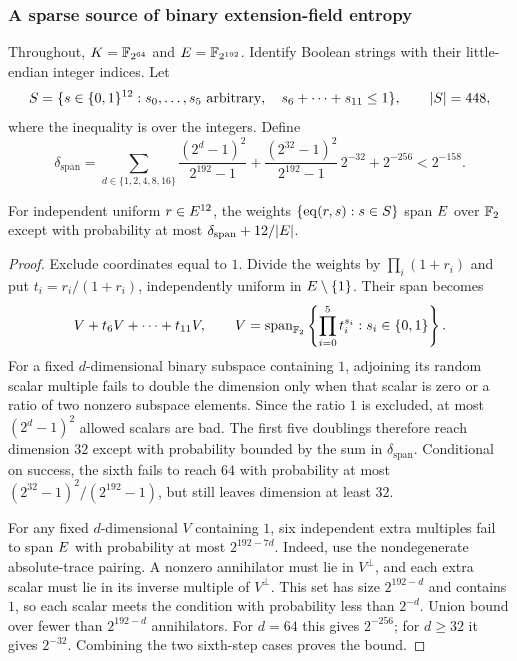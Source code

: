 \subsubsection{A sparse source of binary extension-field entropy}

Throughout, $K=\mathbb{F}_{2^{64}}$ and $E=\mathbb{F}_{2^{192}}$. Identify Boolean strings with their little-endian integer indices. Let
\[
 S=\{s\in\{0,1\}^{12}:s_0,\ldots,s_5\text{ arbitrary},\quad
                     s_6+\cdots+s_{11}\le1\},\qquad |S|=448,
\]
where the inequality is over the integers. Define
\[
 \delta_{\mathrm{span}}=
 \sum_{d\in\{1,2,4,8,16\}}\frac{(2^d-1)^2}{2^{192}-1}
 +\frac{(2^{32}-1)^2}{2^{192}-1}\,2^{-32}+2^{-256}
 <2^{-158}.
\]

\begin{lemma}\label{lem:binary-span}
For independent uniform $r\in E^{12}$, the weights $\{\operatorname{eq}(r,s):s\in S\}$ span $E$ over $\mathbb{F}_2$ except with probability at most $\delta_{\mathrm{span}}+12/|E|$.
\end{lemma}
\begin{proof}
Exclude coordinates equal to $1$. Divide the weights by $\prod_i(1+r_i)$ and put $t_i=r_i/(1+r_i)$, independently uniform in $E\setminus\{1\}$. Their span becomes
\[
 V+t_6V+\cdots+t_{11}V,
 \qquad V=\operatorname{span}_{\mathbb{F}_2}\left\{\prod_{i=0}^5t_i^{s_i}:s_i\in\{0,1\}\right\}.
\]
For a fixed $d$-dimensional binary subspace containing $1$, adjoining its random scalar multiple fails to double the dimension only when that scalar is zero or a ratio of two nonzero subspace elements. Since the ratio $1$ is excluded, at most $(2^d-1)^2$ allowed scalars are bad. The first five doublings therefore reach dimension $32$ except with probability bounded by the sum in $\delta_{\mathrm{span}}$. Conditional on success, the sixth fails to reach $64$ with probability at most $(2^{32}-1)^2/(2^{192}-1)$, but still leaves dimension at least $32$.

For any fixed $d$-dimensional $V$ containing $1$, six independent extra multiples fail to span $E$ with probability at most $2^{192-7d}$. Indeed, use the nondegenerate absolute-trace pairing. A nonzero annihilator must lie in $V^\perp$, and each extra scalar must lie in its inverse multiple of $V^\perp$. This set has size $2^{192-d}$ and contains $1$, so each scalar meets the condition with probability less than $2^{-d}$. Union bound over fewer than $2^{192-d}$ annihilators. For $d=64$ this gives $2^{-256}$; for $d\ge32$ it gives $2^{-32}$. Combining the two sixth-step cases proves the bound.
\end{proof}

